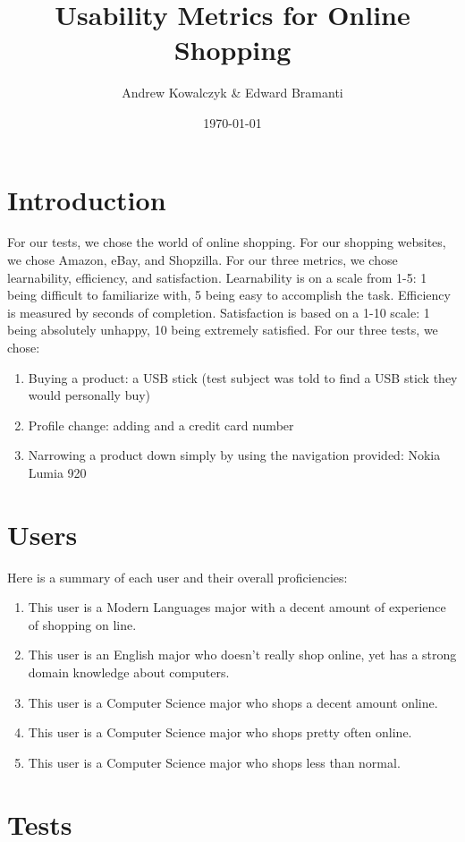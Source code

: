 \documentclass[11pt, oneside]{article}   	%
\title{Usability Metrics for Online Shopping}
\author{Andrew Kowalczyk \& Edward Bramanti}
\date{\today}							%
\begin{document}
\maketitle

\section{Introduction}
For our tests, we chose the world of online shopping. For our shopping websites, we chose Amazon, eBay, and Shopzilla.
For our three metrics, we chose learnability, efficiency, and satisfaction. Learnability is on a scale from 1-5: 1 being difficult to familiarize with, 5 being easy to accomplish the task. Efficiency is measured by seconds of completion. Satisfaction is based on a 1-10 scale: 1 being absolutely unhappy, 10 being extremely satisfied.  For our three tests, we chose:

\begin{enumerate}
    \item Buying a product: a USB stick (test subject was told to find a USB stick they would personally buy)
    \item Profile change: adding and a credit card number
    \item Narrowing a product down simply by using the navigation provided: Nokia Lumia 920
\end{enumerate}

\section{Users}

Here is a summary of each user and their overall proficiencies:

\begin{enumerate}
    \item This user is a Modern Languages major with a decent amount of experience of shopping on line.
    \item This user is an English major who doesn't really shop online, yet has a strong domain knowledge about computers.
    \item This user is a Computer Science major who shops a decent amount online.
    \item This user is a Computer Science major who shops pretty often online.
    \item This user is a Computer Science major who shops less than normal.
\end{enumerate}

\section{Tests}
\end{document}
